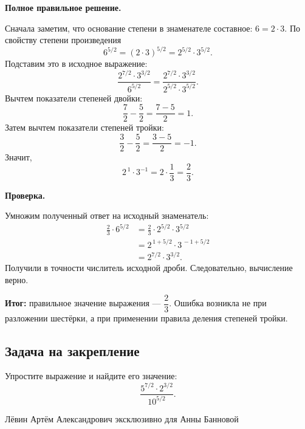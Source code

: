 \documentclass[12pt,a4paper]{article}
\begin{document}
\textbf{Полное правильное решение.}

Сначала заметим, что основание степени в знаменателе
составное: \(6=2\cdot3\). По свойству степени произведения
\[
6^{5/2}=(2\cdot3)^{5/2}
       =2^{5/2}\cdot3^{5/2}.
\]
Подставим это в исходное выражение:
\[
\frac{2^{7/2}\cdot3^{3/2}}{6^{5/2}}
=
\frac{2^{7/2}\cdot3^{3/2}}
     {2^{5/2}\cdot3^{5/2}}.
\]
Вычтем показатели степеней двойки:
\[
\frac72-\frac52=\frac{7-5}{2}=1.
\]
Затем вычтем показатели степеней тройки:
\[
\frac32-\frac52=\frac{3-5}{2}=-1.
\]
Значит,
\[
2^{\,1}\cdot3^{-1}
=2\cdot\frac{1}{3}
=\boxed{\frac23}.
\]

\textbf{Проверка.}

Умножим полученный ответ на исходный знаменатель:
\begin{align*}
\frac23\cdot6^{5/2}
&=\frac23\cdot2^{5/2}\cdot3^{5/2}\\
&=2^{\,1+5/2}\cdot3^{\,-1+5/2}\\
&=2^{7/2}\cdot3^{3/2}.
\end{align*}
Получили в точности числитель исходной дроби.
Следовательно, вычисление верно.

\textcolor{teal!60!black}{\textbf{Итог:}}
правильное значение выражения --- \(\boxed{\dfrac23}\).
Ошибка возникла не при разложении шестёрки,
а при применении правила деления степеней тройки.

\subsection*{Задача на закрепление}
Упростите выражение и найдите его значение:
\[
\frac{5^{7/2}\cdot2^{3/2}}{10^{5/2}}.
\]

\vfill
\begin{center}
\small Лёвин Артём Александрович эксклюзивно для Анны Банновой
\end{center}
\end{document}
